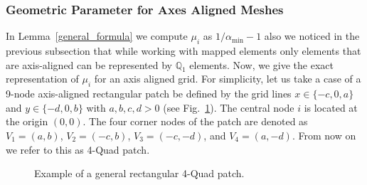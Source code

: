 \documentclass[a4paper]{article}
\theoremstyle{plain}
\theoremstyle{definition}
\theoremstyle{remark}
\begin{document}
\subsubsection{Geometric Parameter for Axes Aligned Meshes}\label{sec:axesaligned}
In Lemma~\ref{general_formula} we compute $\mu_i$ as $1/\alpha_{\min}-1$ also we noticed in the previous subsection that while working with mapped elements only elements that are axis-aligned can be represented by $\mathbb{Q}_1$ elements. Now, we give the exact representation of $\mu_i$ for an axis aligned grid. For simplicity, let us take a case of a 9-node axis-aligned rectangular patch be defined by the grid lines $x \in \{-c, 0, a\}$ and $y \in \{-d, 0, b\}$ with $a, b, c, d > 0$ (see Fig.~\ref{Rect}). The central node $i$ is located at the origin $(0,0)$. The four corner nodes of the patch are denoted as $V_1 = (a,b)$, $V_2 = (-c,b)$, $V_3 = (-c,-d)$, and $V_4 = (a,-d)$. From now on we refer to this as 4-Quad patch.
\begin{figure}[tbp]
\begin{center}
\end{center}
\caption{Example of a general rectangular 4-Quad patch.}
\label{Rect}
\end{figure}
\end{document}
